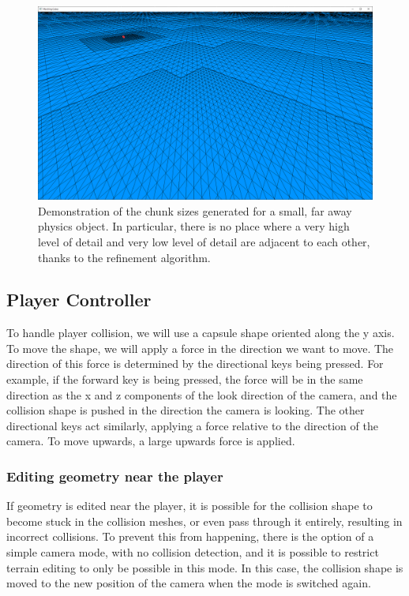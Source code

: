 \documentclass{article}
\begin{document}
\begin{figure}[H]
  \includegraphics[width=\textwidth]{meshes3.png}
  \caption{Demonstration of the chunk sizes generated for a small, far away physics object. In particular, there is no place where a very high level of detail and very low level of detail are adjacent to each other, thanks to the refinement algorithm.}
  \label{fig:meshes3}
\end{figure}

\subsection{Player Controller}
To handle player collision, we will use a capsule shape oriented along the y axis. To move the shape, we will apply a force in the direction we want to move. The direction of this force is determined by the directional keys being pressed. For example, if the forward key is being pressed, the force will be in the same direction as the x and z components of the look direction of the camera, and the collision shape is pushed in the direction the camera is looking. The other directional keys act similarly, applying a force relative to the direction of the camera. To move upwards, a large upwards force is applied. 
\subsubsection{Editing geometry near the player}
If geometry is edited near the player, it is possible for the collision shape to become stuck in the collision meshes, or even pass through it entirely, resulting in incorrect collisions. To prevent this from happening, there is the option of a simple camera mode, with no collision detection, and it is possible to restrict terrain editing to only be possible in this mode. In this case, the collision shape is moved to the new position of the camera when the mode is switched again. %
\end{document}
